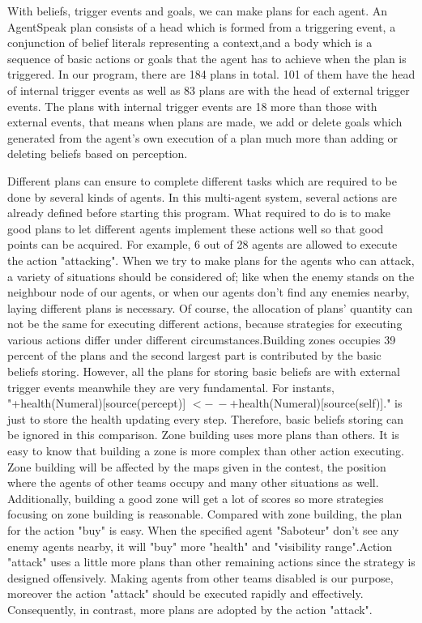 With beliefs, trigger events and goals, we can make plans for each agent. An AgentSpeak plan consists of a head which is formed from a triggering event, a conjunction of belief literals representing a context,and a body which is a sequence of basic actions or goals that the agent has to achieve when the plan is triggered\cite{rafael_BDIAgent_2005}. In our program, there are 184 plans in total. 101 of them have the head of internal trigger events as well as 83 plans are with the head of external trigger events. The plans with internal trigger events are 18 more than those with external events, that means when plans are made, we add or delete goals which generated from the agent’s own execution of a plan much more than adding or deleting beliefs based on perception. 

Different plans can ensure to complete different tasks which are required to be done by several kinds of agents. In this multi-agent system, several actions are already defined before starting this program. What required to do is to make good plans to let different agents implement these actions well so that good points can be acquired. For example, 6 out of 28 agents are allowed to execute the action "attacking". When we try to make plans for the agents who can attack, a variety of situations should be considered of; like when the enemy stands on the neighbour node of our agents, or when our agents don't find any enemies nearby, laying different plans is necessary. Of course, the allocation of plans' quantity can not be the same for executing different actions, because strategies for executing various actions differ under different circumstances.Building zones occupies 39 percent of the plans and the second largest part is contributed by the basic beliefs storing. However, all the plans for storing basic beliefs are with external trigger events meanwhile they are very fundamental. For instants, "+health(Numeral)[source(percept)] $<- \ -+$health(Numeral)[source(self)]." is just to store the health updating every step. Therefore, basic beliefs storing can be ignored in this comparison. Zone building uses more plans than others. It is easy to know that building a zone is more complex than other action executing. Zone building will be affected by the maps given in the contest, the position where the agents of other teams occupy and many other situations as well. Additionally, building a good zone will get a lot of scores so more strategies focusing on zone building is reasonable. Compared with zone building, the plan for the action "buy" is easy. When the specified agent "Saboteur" don't see any enemy agents nearby, it will "buy" more "health" and "visibility range".Action "attack" uses a little more plans than other remaining actions since the strategy is designed offensively. Making agents from other teams disabled is our purpose, moreover the action "attack" should be executed rapidly and effectively. Consequently, in contrast, more plans are adopted by the action "attack".

